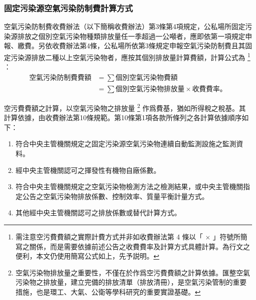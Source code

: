 \subsubsection{固定污染源空氣污染防制費計算方式}

空氣污染防制費收費辦法（以下簡稱收費辦法）第3條第4項規定，公私場所固定污染源排放之個別空氣污染物種類排放量任一季超過一公噸者，應即依第一項規定申報、繳費。另依收費辦法第4條，公私場所依第3條規定申報空氣污染防制費且其固定污染源排放二種以上空氣污染物者，應按其個別排放量計算費額，計算公式為
\footnote{需注意空污費費額之實際計費方式并非如收費辦法第 4 條以「 $\times$ 」符號所簡寫之關係，而是需要依據前述公告之收費費率及計算方式具體計算。為行文之便利，本文仍使用簡寫公式如上，先予説明。}
：
\begin{equation}
   \begin{aligned}
     \text{空氣污染防制費費額}&=\sum \text{個別空氣污染物費額}\\
     &=\sum\text{個別空氣污染物排放量}\times \text{收費費率。}
   \end{aligned}
 \end{equation}



空污費費額之計算，以空氣污染物之排放量
\footnote{空氣污染物排放量之重要性，不僅在於作爲空污費費額之計算依據。匯整空氣污染物之排放量，建立完備的排放清單（排放清冊），是空氣污染管制的重要措施，也是環工、大氣、公衛等學科研究的重要實證基礎。}
作爲費基，猶如所得稅之稅基。其計算依據，由收費辦法第10條規範。第10條第1項各款所條列之各計算依據順序如下：

\begin{enumerate}[itemsep=0em]
   \item 符合中央主管機關規定之固定污染源空氣污染物連續自動監測設施之監測資料。
   \item 經中央主管機關認可之揮發性有機物自廠係數。
   \item 符合中央主管機關規定之空氣污染物檢測方法之檢測結果，或中央主管機關指定公告之空氣污染物排放係數、控制效率、質量平衡計量方式。
   \item 其他經中央主管機關認可之排放係數或替代計算方式。
\end{enumerate}

